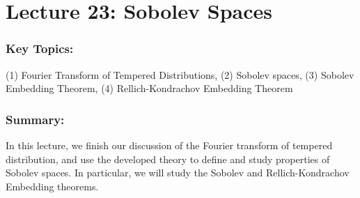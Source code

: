 \documentclass{article}
\begin{document}
\newpage 
\section{Lecture 23: Sobolev Spaces}
\subsubsection{Key Topics:} (1) Fourier Transform of Tempered Distributions, (2) Sobolev spaces, (3) Sobolev Embedding Theorem, (4) Rellich-Kondrachov Embedding Theorem 

\subsubsection{Summary:} In this lecture, we finish our discussion of the Fourier transform of tempered distribution, and use the developed theory to define and study properties of Sobolev spaces. In particular, we will study the Sobolev and Rellich-Kondrachov Embedding theorems. 
\end{document}

